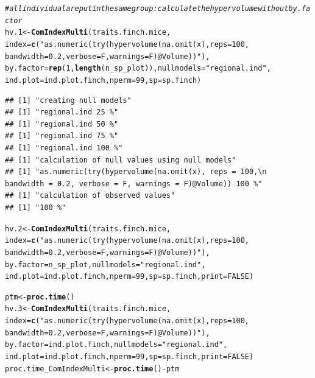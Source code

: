 \documentclass[12pt]{article}\usepackage[]{graphicx}\usepackage[]{color}
\makeatletter
\newcommand{\hlnum}[1]{\textcolor[rgb]{0.686,0.059,0.569}{#1}}%
\newcommand{\hlstr}[1]{\textcolor[rgb]{0.192,0.494,0.8}{#1}}%
\newcommand{\hlcom}[1]{\textcolor[rgb]{0.678,0.584,0.686}{\textit{#1}}}%
\newcommand{\hlopt}[1]{\textcolor[rgb]{0,0,0}{#1}}%
\newcommand{\hlstd}[1]{\textcolor[rgb]{0.345,0.345,0.345}{#1}}%
\newcommand{\hlkwb}[1]{\textcolor[rgb]{0.69,0.353,0.396}{#1}}%
\newcommand{\hlkwc}[1]{\textcolor[rgb]{0.333,0.667,0.333}{#1}}%
\newcommand{\hlkwd}[1]{\textcolor[rgb]{0.737,0.353,0.396}{\textbf{#1}}}%
\newenvironment{kframe}{%
 \def\at@end@of@kframe{}%
 \ifinner\ifhmode%
  \def\at@end@of@kframe{\end{minipage}}%
  \begin{minipage}{\columnwidth}%
 \fi\fi%
 \def\FrameCommand##1{\hskip\@totalleftmargin \hskip-\fboxsep
 \colorbox{shadecolor}{##1}\hskip-\fboxsep
     \hskip-\linewidth \hskip-\@totalleftmargin \hskip\columnwidth}%
 \MakeFramed {\advance\hsize-\width
   \@totalleftmargin\z@ \linewidth\hsize
   \@setminipage}}%
 {\par\unskip\endMakeFramed%
 \at@end@of@kframe}
\newenvironment{knitrout}{}{} %
\makeatother
\begin{document}
\begin{knitrout}
\color{fgcolor}\begin{kframe}
\begin{alltt}
\hlcom{#all individual are put in the same group: calculate the hypervolume without by.factor}
\hlstd{hv.1}\hlkwb{<-}\hlkwd{ComIndexMulti}\hlstd{(traits.finch.mice,}
             \hlkwc{index} \hlstd{=} \hlkwd{c}\hlstd{(}\hlstr{"as.numeric(try(hypervolume(na.omit(x), reps = 100,
                       bandwidth = 0.2, verbose = F, warnings = F)@Volume))"}\hlstd{),}
             \hlkwc{by.factor} \hlstd{=} \hlkwd{rep}\hlstd{(}\hlnum{1}\hlstd{,}\hlkwd{length}\hlstd{(n_sp_plot)),} \hlkwc{nullmodels} \hlstd{=} \hlstr{"regional.ind"}\hlstd{,}
             \hlkwc{ind.plot} \hlstd{= ind.plot.finch,} \hlkwc{nperm} \hlstd{=} \hlnum{99}\hlstd{,} \hlkwc{sp} \hlstd{= sp.finch)}
\end{alltt}
\begin{verbatim}
## [1] "creating null models"
## [1] "regional.ind 25 %"
## [1] "regional.ind 50 %"
## [1] "regional.ind 75 %"
## [1] "regional.ind 100 %"
## [1] "calculation of null values using null models"
## [1] "as.numeric(try(hypervolume(na.omit(x), reps = 100,\n                       bandwidth = 0.2, verbose = F, warnings = F)@Volume)) 100 %"
## [1] "calculation of observed values"
## [1] "100 %"
\end{verbatim}
\begin{alltt}
\hlstd{hv.2}\hlkwb{<-}\hlkwd{ComIndexMulti}\hlstd{(traits.finch.mice,}
             \hlkwc{index} \hlstd{=} \hlkwd{c}\hlstd{(}\hlstr{"as.numeric(try(hypervolume(na.omit(x), reps = 100,
                       bandwidth = 0.2, verbose = F, warnings = F)@Volume))"}\hlstd{),}
             \hlkwc{by.factor} \hlstd{= n_sp_plot,} \hlkwc{nullmodels} \hlstd{=} \hlstr{"regional.ind"}\hlstd{,}
             \hlkwc{ind.plot} \hlstd{= ind.plot.finch,} \hlkwc{nperm} \hlstd{=} \hlnum{99}\hlstd{,} \hlkwc{sp} \hlstd{= sp.finch,} \hlkwc{print} \hlstd{=} \hlnum{FALSE}\hlstd{)}

\hlstd{ptm} \hlkwb{<-} \hlkwd{proc.time}\hlstd{()}
\hlstd{hv.3}\hlkwb{<-}\hlkwd{ComIndexMulti}\hlstd{(traits.finch.mice,}
             \hlkwc{index} \hlstd{=} \hlkwd{c}\hlstd{(}\hlstr{"as.numeric(try(hypervolume(na.omit(x), reps = 100,
                       bandwidth = 0.2, verbose = F, warnings = F)@Volume))"}\hlstd{),}
             \hlkwc{by.factor} \hlstd{= ind.plot.finch,} \hlkwc{nullmodels} \hlstd{=}\hlstr{"regional.ind"}\hlstd{,}
             \hlkwc{ind.plot} \hlstd{= ind.plot.finch,} \hlkwc{nperm} \hlstd{=} \hlnum{99}\hlstd{,} \hlkwc{sp} \hlstd{= sp.finch,} \hlkwc{print} \hlstd{=} \hlnum{FALSE}\hlstd{)}
\hlstd{proc.time_ComIndexMulti} \hlkwb{<-} \hlkwd{proc.time}\hlstd{()} \hlopt{-} \hlstd{ptm}


\end{alltt}
\end{kframe}
\end{knitrout}
\end{document}
